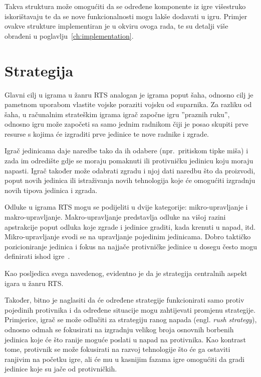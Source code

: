 \documentclass[times, utf8, zavrsni, numeric]{fer}
\begin{document}
\par Takva struktura može omogućiti da se određene komponente iz igre višestruko iskorištavaju te da se nove funkcionalnosti mogu lakše dodavati u igru.
Primjer ovakve strukture implementiran je u okviru ovoga rada, te su detalji više obrađeni u poglavlju~\ref{ch:implementation}.

\section{Strategija}

\par Glavni cilj u igrama u žanru RTS analogan je igrama poput šaha, odnosno cilj je pametnom uporabom vlastite vojske poraziti vojsku od suparnika. 
Za razliku od šaha, u računalnim strateškim igrama igrač započne igru ''praznih ruku'', odnosno igru može započeti sa samo jednim radnikom čiji je posao skupiti prve resurse s kojima će izgraditi prve jedinice te nove radnike i zgrade.

\par Igrač jedinicama daje naredbe tako da ih odabere (npr.\ pritiskom tipke miša) i zada im odredište gdje se moraju pomaknuti ili protivničku jedinicu koju moraju napasti. 
Igrač također može odabrati zgradu i njoj dati naredbu što da proizvodi, poput novih jedinica ili istraživanja novih tehnologija koje će omogućiti izgradnju novih tipova jedinica i zgrada.

\par Odluke u igrama RTS mogu se podijeliti u dvije kategorije: mikro-upravljanje i makro-upravljanje. 
Makro-upravljanje predstavlja odluke na višoj razini apstrakcije poput odluka koje zgrade i jedinice graditi, kada krenuti u napad, itd. 
Mikro-upravljanje svodi se na upravljanje pojedinim jedinicama.
Dobro taktičko pozicioniranje jedinica i fokus na najjače protivničke jedinice u dosegu često mogu definirati ishod igre~\cite{article:HybridPathdinding}.

\par Kao posljedica svega navedenog, evidentno je da je strategija centralnih aspekt igara u žanru RTS.

\par Također, bitno je naglasiti da će određene strategije funkcionirati samo protiv pojedinih protivnika i da određene situacije mogu zahtijevati promjenu strategije. 
Primjerice, igrač se može odlučiti za strategiju ranog napada (engl. \textit{rush strategy}), odnosno odmah se fokusirati na izgradnju velikog broja osnovnih borbenih jedinica koje će što ranije moguće poslati u napad na protivnika.
Kao kontrast tome, protivnik se može fokusirati na razvoj tehnologije što će ga ostaviti ranjivim na početku igre, ali će mu u kasnijim fazama igre omogućiti da gradi jedinice koje su jače od protivničkih.
\end{document}
